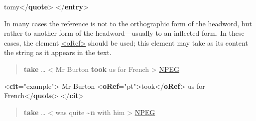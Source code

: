 \begin{shaded}
\hspace*{1em}\mbox{}\newline 
\hspace*{1em}\hspace*{1em}tomy{</\textbf{quote}>}\mbox{}\newline 
{}\mbox{}\newline 
{</\textbf{entry}>}\end{shaded}\egroup\par \noindent                                                                        \par
In many cases the reference is not to the orthographic form of the headword, but rather to another form of the headword—usually to an inflected form. In these cases, the element \hyperref[TEI.oRef]{<oRef>} should be used; this element may take as its content the string as it appears in the text.
\begin{quote}{\bfseries take} … < Mr Burton {\bfseries took} us for French > \hyperref[DIC-NPEG]{NPEG}\end{quote}
 \par\bgroup{}\exampleFont \begin{shaded}\noindent\mbox{}{<\textbf{cit}\hspace*{1em}{type}="{example}">}\mbox{}\newline 
{}Mr Burton {<\textbf{oRef}\hspace*{1em}{type}="{pt}">}took{</\textbf{oRef}>} us for French{</\textbf{quote}>}\mbox{}\newline 
{</\textbf{cit}>}\end{shaded}\egroup\par \noindent  
\begin{quote}{\bfseries take} … < was quite {\bfseries \textasciitilde n} with him > \hyperref[DIC-NPEG]{NPEG}\end{quote}
